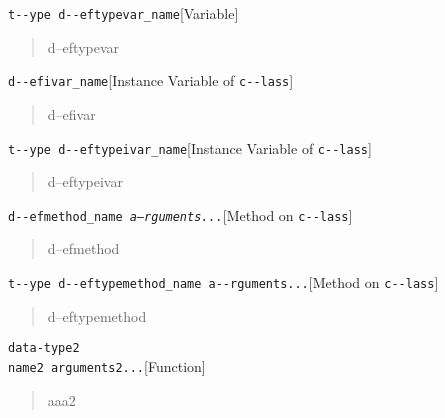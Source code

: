 \documentclass{book}
\begin{document}
\begin{titlepage}
\noindent\texttt{t{-}{-}ype d{-}{-}eftypevar\_name}\hfill[Variable]



%
\begin{quote}
\unskip{\parskip=0pt\noindent}%
d--eftypevar
\end{quote}

\noindent\texttt{d{-}{-}efivar\_name}\hfill[Instance Variable of \texttt{c{-}{-}lass}]



%
\begin{quote}
\unskip{\parskip=0pt\noindent}%
d--efivar
\end{quote}

\noindent\texttt{t{-}{-}ype d{-}{-}eftypeivar\_name}\hfill[Instance Variable of \texttt{c{-}{-}lass}]



%
\begin{quote}
\unskip{\parskip=0pt\noindent}%
d--eftypeivar
\end{quote}

\noindent\texttt{d{-}{-}efmethod\_name \EmbracOn{}\textnormal{\textsl{a--rguments...}}\EmbracOff{}}\hfill[Method on \texttt{c{-}{-}lass}]



%
\begin{quote}
\unskip{\parskip=0pt\noindent}%
d--efmethod
\end{quote}

\noindent\texttt{t{-}{-}ype d{-}{-}eftypemethod\_name a{-}{-}rguments...}\hfill[Method on \texttt{c{-}{-}lass}]



%
\begin{quote}
\unskip{\parskip=0pt\noindent}%
d--eftypemethod
\end{quote}


\noindent\texttt{data-type2\leavevmode{}\\name2 arguments2...}\hfill[Function]



%
\begin{quote}
\unskip{\parskip=0pt\noindent}%
aaa2
\end{quote}


\end{titlepage}
\end{document}
